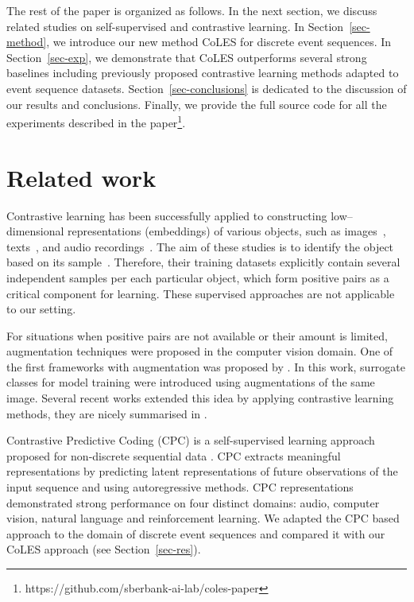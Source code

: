 \documentclass[sigconf]{acmart}
\begin{document}
The rest of the paper is organized as follows. In the next section, we discuss related studies on self-supervised and contrastive learning. In Section~\ref{sec-method}, we introduce our new method CoLES for discrete event sequences. In Section~\ref{sec-exp}, we demonstrate that CoLES outperforms several strong baselines including previously proposed contrastive learning methods adapted to event sequence datasets. Section~\ref{sec-conclusions} is dedicated to the discussion of our results and conclusions.
Finally, we provide the full source code for all the experiments described in the paper\footnote{https://github.com/sberbank-ai-lab/coles-paper}.

\section{Related work} \label{sec-rel-work}

Contrastive learning has been successfully applied to constructing low--dimensional representations (embeddings) of various objects, such as images~\citep{Chopra2005LearningAS, Schroff2015FaceNetAU}, texts~\citep{Reimers2019SentenceBERTSE}, and audio recordings~\citep{Wan2018GeneralizedEL}.
The aim of these studies is to identify the object based on its sample~\citep{Schroff2015FaceNetAU, Hu2014DiscriminativeDM, Wan2018GeneralizedEL}. Therefore, their training datasets explicitly contain several independent samples per each particular object, which form positive pairs as a critical component for learning. These supervised approaches are not applicable to our setting.

For situations when positive pairs are not available or their amount is limited, augmentation techniques were proposed in the computer vision domain. One of the first frameworks with augmentation  was proposed by \cite{Dosovitskiy2014DiscriminativeUF}. In this work, surrogate classes for model training were introduced using augmentations of the same image. Several recent works \citep{Bachman2019LearningRB, He2019MomentumCF, Chen2020ASF} extended this idea by applying contrastive learning methods, they are nicely summarised in \cite{Falcon2020AFF}.

Contrastive Predictive Coding (CPC) is a self-supervised learning approach proposed for non-discrete sequential data \citep{Oord2018RepresentationLW}. CPC extracts meaningful representations by predicting latent representations of future observations of the input sequence and using autoregressive methods. CPC representations demonstrated strong performance on four distinct domains: audio, computer vision, natural language and reinforcement learning. We adapted the CPC based approach to the domain of discrete event sequences and compared it with our CoLES approach (see Section~\ref{sec-res}).
\end{document}
